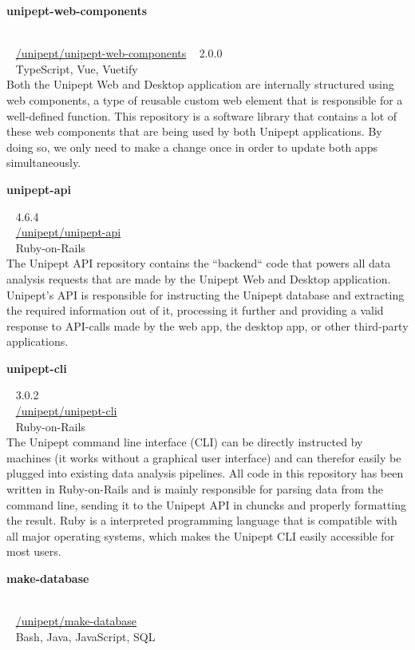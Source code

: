 \begin{large}\textbf{\textsf{unipept-web-components}}\end{large} \\
\faGithub ~ \href{https://github.com/unipept/unipept-web-components}{\textsf{/unipept/unipept-web-components}} \hfill \faTag ~ \textsf{2.0.0} \\
\faCode ~ \textsf{TypeScript, Vue, Vuetify} \\
Both the Unipept Web and Desktop application are internally structured using web components, a type of reusable custom web element that is responsible for a well-defined function.
This repository is a software library that contains a lot of these web components that are being used by both Unipept applications.
By doing so, we only need to make a change once in order to update both apps simultaneously.

\begin{large}\textbf{\textsf{unipept-api}}\end{large} \hfill \faTag ~ \textsf{4.6.4} \\
\faGithub ~ \href{https://github.com/unipept/unipept-api}{\textsf{/unipept/unipept-api}} \\
\faCode ~ \textsf{Ruby-on-Rails} \\
The Unipept API repository contains the ``backend`` code that powers all data analysis requests that are made by the Unipept Web and Desktop application.
Unipept's API is responsible for instructing the Unipept database and extracting the required information out of it, processing it further and providing a valid response to API-calls made by the web app, the desktop app, or other third-party applications.

\begin{large}\textbf{\textsf{unipept-cli}}\end{large} \hfill \faTag ~ \textsf{3.0.2} \\
\faGithub ~ \href{https://github.com/unipept/unipept-cli}{\textsf{/unipept/unipept-cli}} \\
\faCode ~ \textsf{Ruby-on-Rails} \\
The Unipept command line interface (CLI) can be directly instructed by machines (it works without a graphical user interface) and can therefor easily be plugged into existing data analysis pipelines.
All code in this repository has been written in Ruby-on-Rails and is mainly responsible for parsing data from the command line, sending it to the Unipept API in chuncks and properly formatting the result.
Ruby is a interpreted programming language that is compatible with all major operating systems, which makes the Unipept CLI easily accessible for most users.

\begin{large}\textbf{\textsf{make-database}}\end{large} \\
\faGithub ~ \href{https://github.com/unipept/make-database}{\textsf{/unipept/make-database}} \\
\faCode ~ \textsf{Bash, Java, JavaScript, SQL} \\


\newpage
